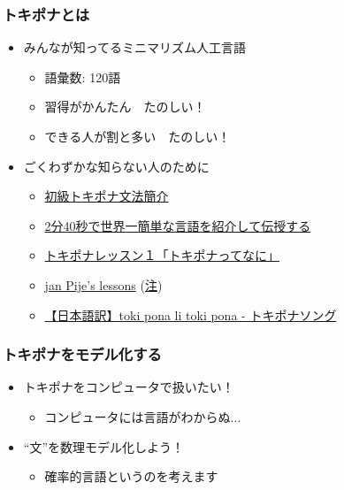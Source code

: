 \documentclass[14pt]{beamer}
\begin{document}
\begin{frame}
	\frametitle{トキポナとは}

	\begin{itemize}
		\item みんなが知ってるミニマリズム人工言語
			\begin{itemize}
				\item 語彙数: \alert{120語}
				\item 習得がかんたん　たのしい！
				\item できる人が割と多い　たのしい！
			\end{itemize}
		\item ごくわずかな知らない人のために
			\begin{itemize}
				\item \href{https://twitter.com/notolytos/status/1409484535151042568}{\small 初級トキポナ文法簡介}
				\item \href{https://www.youtube.com/watch?v=9C0YqTs4vB8}{\small 2分40秒で世界一簡単な言語を紹介して伝授する}
				\item \href{https://www.youtube.com/watch?v=wIFJfAhiPlE}{\small トキポナレッスン１「トキポナってなに」}
				\item \href{https://en.wikibooks.org/wiki/Updated\_jan\_Pije\%27s\_lessons}{\small jan Pije's lessons} 
					{\scriptsize (\href{https://github.com/stefichjo/toki-pona/blob/master/pije.md}{注})}
				\item \href{https://www.youtube.com/watch?v=2jRtYBaZGgQ}{\small 【日本語訳】toki pona li toki pona - トキポナソング}
			\end{itemize}
	\end{itemize}
\end{frame}

\begin{frame}
	\frametitle{トキポナをモデル化する}

	\begin{itemize}
		\item トキポナをコンピュータで扱いたい！
			\begin{itemize}
				\item コンピュータには言語がわからぬ...
			\end{itemize}
		\item ``文''を数理モデル化しよう！
			\begin{itemize}
				\item \alert{確率的言語}というのを考えます
			\end{itemize}
	\end{itemize}
\end{frame}
\end{document}

